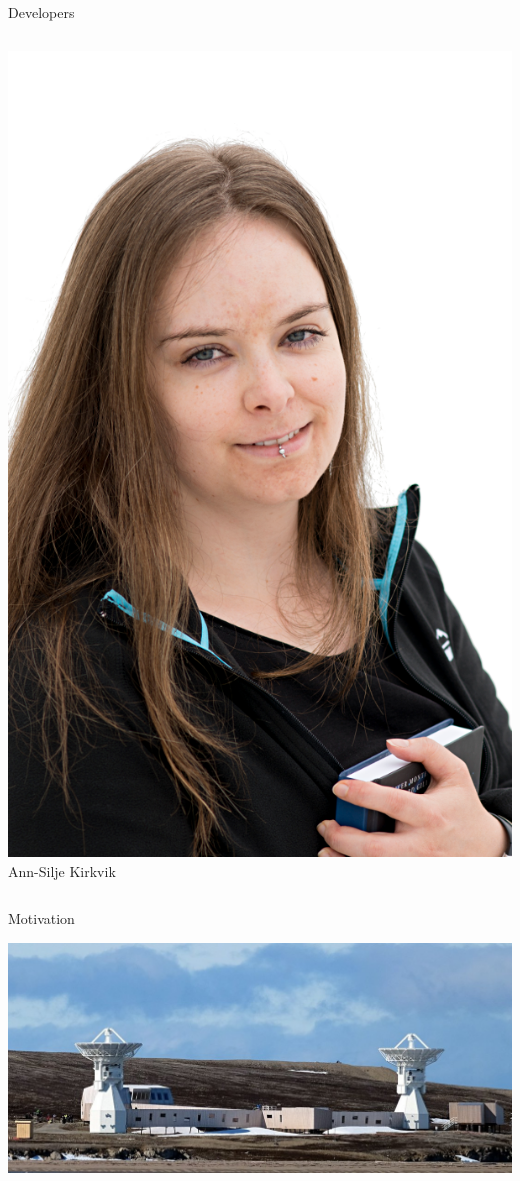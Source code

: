 \documentclass[14pt,c]{beamer}
\begin{document}
\begin{frame}{Developers}
\begin{columns}[t]
    \begin{center}
      \includegraphics[width=\linewidth]{figure/annsilje} \\
      Ann-Silje Kirkvik
    \end{center}
  \end{columns}
\end{frame}

\begin{frame}{Motivation}
  \begin{centering}
    \includegraphics[width=.8\paperwidth]{figure/brandal}
  \end{centering}
\end{frame}
\end{document}
